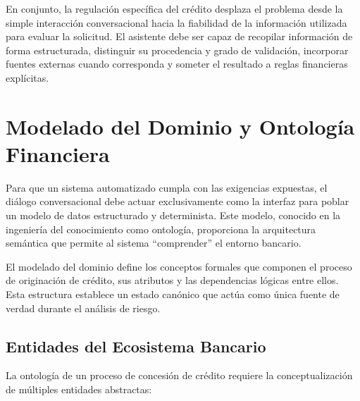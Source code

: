 \documentclass[12pt,a4paper]{report}
\begin{document}
En conjunto, la regulación específica del crédito desplaza el problema desde la simple interacción conversacional hacia la fiabilidad de la información utilizada para evaluar la solicitud. El asistente debe ser capaz de recopilar información de forma estructurada, distinguir su procedencia y grado de validación, incorporar fuentes externas cuando corresponda y someter el resultado a reglas financieras explícitas.

\section{Modelado del Dominio y Ontología Financiera}

Para que un sistema automatizado cumpla con las exigencias expuestas, el diálogo conversacional debe actuar exclusivamente como la interfaz para poblar un modelo de datos estructurado y determinista. Este modelo, conocido en la ingeniería del conocimiento como ontología, proporciona la arquitectura semántica que permite al sistema ``comprender'' el entorno bancario.

El modelado del dominio define los conceptos formales que componen el proceso de originación de crédito, sus atributos y las dependencias lógicas entre ellos. Esta estructura establece un estado canónico que actúa como única fuente de verdad durante el análisis de riesgo.

\subsection{Entidades del Ecosistema Bancario}

La ontología de un proceso de concesión de crédito requiere la conceptualización de múltiples entidades abstractas:
\end{document}
